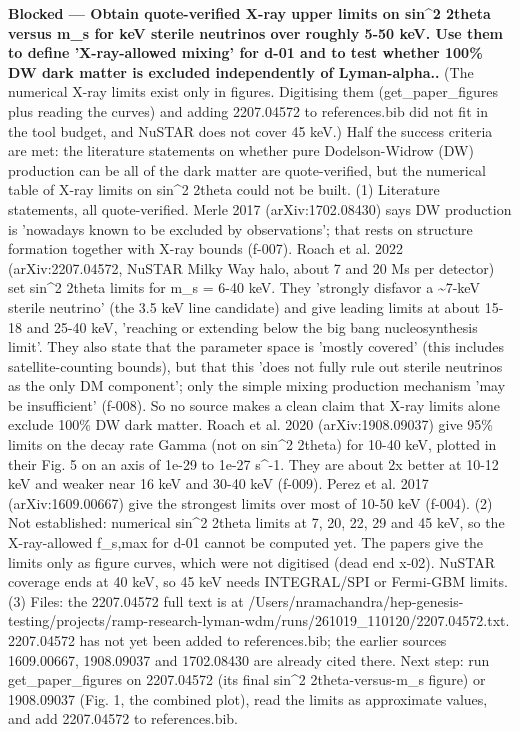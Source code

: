 \documentclass[11pt,a4paper]{article}
\begin{document}
\textbf{Blocked --- Obtain quote-verified X-ray upper limits on sin\textasciicircum{}2 2theta versus m\_s for keV sterile neutrinos over roughly 5-50 keV. Use them to define 'X-ray-allowed mixing' for d-01 and to test whether 100\% DW dark matter is excluded independently of Lyman-alpha..} (The numerical X-ray limits exist only in figures. Digitising them (get\_paper\_figures plus reading the curves) and adding 2207.04572 to references.bib did not fit in the tool budget, and NuSTAR does not cover 45 keV.) Half the success criteria are met: the literature statements on whether pure Dodelson-Widrow (DW) production can be all of the dark matter are quote-verified, but the numerical table of X-ray limits on sin\textasciicircum{}2 2theta could not be built. (1) Literature statements, all quote-verified. Merle 2017 (arXiv:1702.08430) says DW production is 'nowadays known to be excluded by observations'; that rests on structure formation together with X-ray bounds (f-007). Roach et al. 2022 (arXiv:2207.04572, NuSTAR Milky Way halo, about 7 and 20 Ms per detector) set sin\textasciicircum{}2 2theta limits for m\_s = 6-40 keV. They 'strongly disfavor a \textasciitilde{}7-keV sterile neutrino' (the 3.5 keV line candidate) and give leading limits at about 15-18 and 25-40 keV, 'reaching or extending below the big bang nucleosynthesis limit'. They also state that the parameter space is 'mostly covered' (this includes satellite-counting bounds), but that this 'does not fully rule out sterile neutrinos as the only DM component'; only the simple mixing production mechanism 'may be insufficient' (f-008). So no source makes a clean claim that X-ray limits alone exclude 100\% DW dark matter. Roach et al. 2020 (arXiv:1908.09037) give 95\% limits on the decay rate Gamma (not on sin\textasciicircum{}2 2theta) for 10-40 keV, plotted in their Fig. 5 on an axis of 1e-29 to 1e-27 s\textasciicircum{}-1. They are about 2x better at 10-12 keV and weaker near 16 keV and 30-40 keV (f-009). Perez et al. 2017 (arXiv:1609.00667) give the strongest limits over most of 10-50 keV (f-004). (2) Not established: numerical sin\textasciicircum{}2 2theta limits at 7, 20, 22, 29 and 45 keV, so the X-ray-allowed f\_s,max for d-01 cannot be computed yet. The papers give the limits only as figure curves, which were not digitised (dead end x-02). NuSTAR coverage ends at 40 keV, so 45 keV needs INTEGRAL/SPI or Fermi-GBM limits. (3) Files: the 2207.04572 full text is at /Users/nramachandra/hep-genesis-testing/projects/ramp-research-lyman-wdm/runs/261019\_110120/2207.04572.txt. 2207.04572 has not yet been added to references.bib; the earlier sources 1609.00667, 1908.09037 and 1702.08430 are already cited there. Next step: run get\_paper\_figures on 2207.04572 (its final sin\textasciicircum{}2 2theta-versus-m\_s figure) or 1908.09037 (Fig. 1, the combined plot), read the limits as approximate values, and add 2207.04572 to references.bib.
\end{document}
